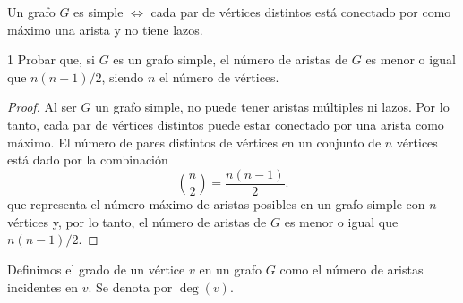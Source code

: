 \begin{definition}
    Un grafo \( G \) es simple \( \iff \) cada par de vértices distintos está conectado por como máximo una arista y no tiene lazos.
\end{definition}

\begin{ejercicio}{1}
    Probar que, si \( G \) es un grafo simple, el número de aristas de \( G \) es menor o igual que \( n(n-1)/2 \), siendo \( n \) el número de vértices.
\end{ejercicio}
\begin{proof}
    Al ser \( G \) un grafo simple, no puede tener aristas múltiples ni lazos. Por lo tanto, cada par de vértices distintos puede estar conectado por
    una arista como máximo. El número de pares distintos de vértices en un conjunto de \( n \) vértices está dado por la combinación \[
        \binom{n}{2} = \frac{n(n-1)}{2}.
    \]
    que representa el número máximo de aristas posibles en un grafo simple con \( n \) vértices y, por lo tanto, el número de aristas de \( G \) es menor o igual que \( n(n-1)/2 \).
\end{proof}

\vspace{0.5cm}

\begin{definition}\label{def:grado}
    Definimos el grado de un vértice \( v \) en un grafo \( G \) como el número de aristas incidentes en \( v \). Se denota por \( \deg(v) \).
\end{definition}

